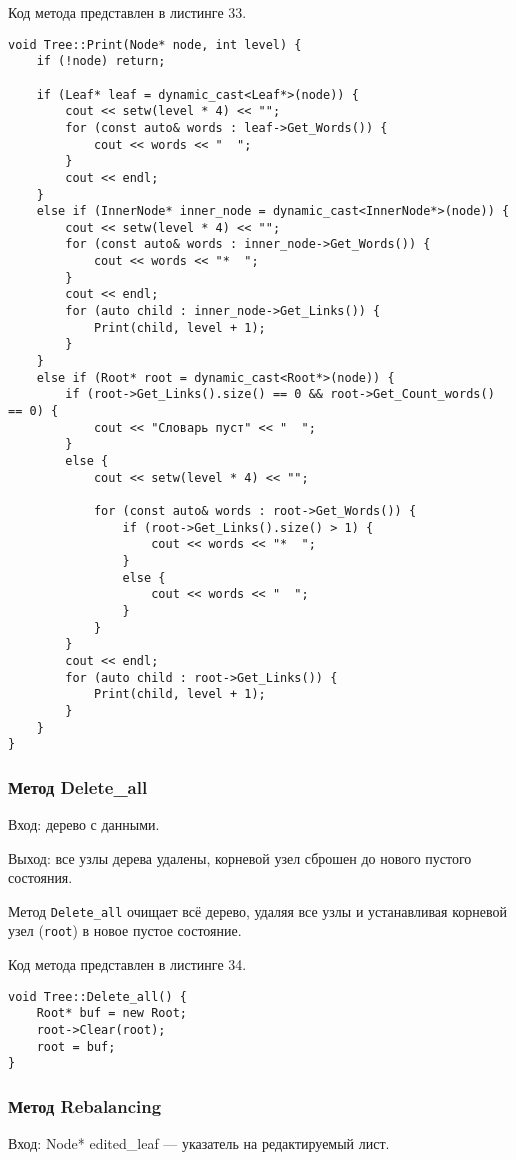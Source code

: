 \documentclass[10pt,a4paper,final]{article} %
\begin{document}
Код метода представлен в листинге 33. \begin{lstlisting}[label=printTreeMethod, caption = Метод Print для класса Tree] 
void Tree::Print(Node* node, int level) {
	if (!node) return;
	
	if (Leaf* leaf = dynamic_cast<Leaf*>(node)) {
		cout << setw(level * 4) << "";
		for (const auto& words : leaf->Get_Words()) {
			cout << words << "  ";
		}
		cout << endl;
	}
	else if (InnerNode* inner_node = dynamic_cast<InnerNode*>(node)) {
		cout << setw(level * 4) << "";
		for (const auto& words : inner_node->Get_Words()) {
			cout << words << "*  ";
		}
		cout << endl;
		for (auto child : inner_node->Get_Links()) {
			Print(child, level + 1);
		}
	}
	else if (Root* root = dynamic_cast<Root*>(node)) {
		if (root->Get_Links().size() == 0 && root->Get_Count_words() == 0) {
			cout << "Словарь пуст" << "  ";
		}
		else {
			cout << setw(level * 4) << "";
			
			for (const auto& words : root->Get_Words()) {
				if (root->Get_Links().size() > 1) {
					cout << words << "*  ";
				}
				else {
					cout << words << "  ";
				}
			}
		}
		cout << endl;
		for (auto child : root->Get_Links()) {
			Print(child, level + 1);
		}
	}	
}\end{lstlisting}


\subsubsection{Метод Delete\_all}
Вход: дерево с данными. \par
Выход: все узлы дерева удалены, корневой узел сброшен до нового пустого состояния. \par
\par Метод \texttt{Delete\_all} очищает всё дерево, удаляя все узлы и устанавливая корневой узел (\texttt{root}) в новое пустое состояние.

Код метода представлен в листинге 34. \begin{lstlisting}[label=deleteAllMethod, caption = Метод Delete\_all для класса Tree] 
void Tree::Delete_all() {
	Root* buf = new Root;
	root->Clear(root);
	root = buf;
}\end{lstlisting}


\subsubsection{Метод Rebalancing}
Вход: Node* edited\_leaf — указатель на редактируемый лист. \par
\end{document}
